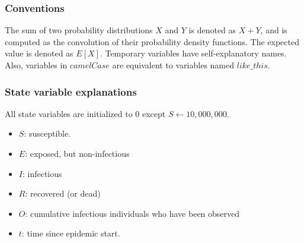 \documentclass{article}
\begin{document}
\subsubsection{Conventions}
The sum of two probability distributions $X$ and $Y$ is denoted as $X+Y$, and is computed as the convolution of their probability density functions. The expected value is denoted as $E[X]$. Temporary variables have self-explanatory names. Also, variables in $camelCase$ are equivalent to variables named $like\_this$. 


\subsubsection{State variable explanations}
All state variables are initialized to 0 except $S \gets 10,000,000$. 

\begin{itemize}
    \item $S$: susceptible.
    \item $E$: exposed, but non-infectious
    \item $I$: infectious
    \item $R$: recovered (or dead)
    \item $O$: cumulative infectious individuals who have been observed 
    \item $t$: time since epidemic start.
\end{itemize}
\end{document}
